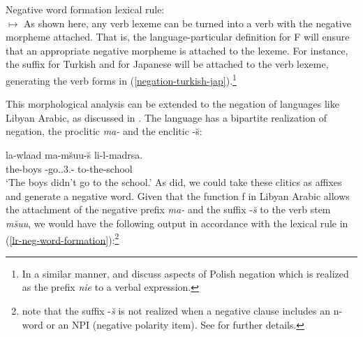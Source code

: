 \documentclass[output=paper
                ,modfonts
                ,nonflat
	        ,collection
	        ,collectionchapter
	        ,collectiontoclongg
 	        ,biblatex
                ,babelshorthands
                ,newtxmath
                ,draftmode
                ,colorlinks, citecolor=brown
]{./langsci/langscibook}
\begin{document}
{\begin{exe}
\begin{xlist}
\begin{exe}
\begin{xlist}
\ea
\label{lr-neg-word-formation}
Negative word formation lexical rule:\\
 $\mapsto$
\z
%
%
As shown here, any verb lexeme can be turned into a verb with the negative
morpheme attached. That is, the language-particular definition for
F will ensure that an appropriate
negative morpheme is attached to the lexeme. For instance, the
suffix  for Turkish
and  for Japanese will be attached to the
 verb lexeme, generating
the verb forms in (\ref{negation-turkish-jap}).\footnote{In a similar
manner, \citet{PK:99} and \citet{Prz:00, Prz:01}
discuss aspects of Polish negation which is realized as the prefix
  \emph{nie} to a verbal expression.}
%

This morphological analysis can be extended to the negation of languages
like Libyan Arabic, as discussed in \citet{BK:12}. The language
has a bipartite realization of negation, the proclitic \emph{ma-} and the enclitic -\u{s}:

\ea
\gll la-wlaad ma-m\u{s}uu-\u{s} li-l-madrsa. \\
     the-boys \NEG-go.\pst.3.\pl-\NEG{} to-the-school\\
\glt `The boys didn't go to the school.'
\z
%
As \citet{BK:12} did, we could take these clitics as affixes and generate
a negative word. Given that the function
f in Libyan Arabic allows the attachment of the negative prefix
\textit{ma-} and the suffix -\textit{\u{s}} to the verb
stem \emph{m\u{s}uu}, we would have the following output in accordance
with the lexical rule in (\ref{lr-neg-word-formation}):\footnote{%
   \citet{BK:12} note that the suffix -\textit{\u{s}} is not realized when a negative clause
   includes an n-word or an NPI (negative polarity item). See \citet{BK:12} for further details.}
%
%



\end{xlist}
\end{exe}
\end{xlist}
\end{exe}}
\end{document}
